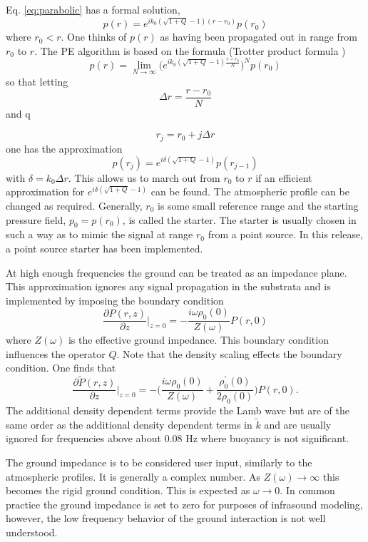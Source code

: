 Eq. \ref{eq:parabolic} has a formal solution, 
\[
p(r)=e^{ik_0(\sqrt{1+Q}-1)(r-r_0)} p(r_0)
\]
where $r_0<r$. One thinks of $p(r)$ as having been propagated out in range from $r_0$ to $r$. The PE algorithm is based on the formula (Trotter product formula \cite{stoer2013introduction})
\begin{equation}\label{eq:trotter_prod}
p(r)=\lim_{N\rightarrow\infty}\Big(e^{ik_0(\sqrt{1+Q}-1)\frac{r-r_0}{N}}\Big)^N p(r_0)
\end{equation}
so that letting 
\[
\Delta r=\frac{r-r_0}{N}
\]
and q

\[
r_j=r_0+j\Delta r
\]
one has the approximation 
\begin{equation}\label{eq:split_step}
p(r_j)=e^{i\delta(\sqrt{1+Q}-1)}p(r_{j-1})
\end{equation}
with $\delta=k_0\Delta r$. This allows us to march out from $r_0$ to $r$ if an efficient approximation for $e^{i\delta(\sqrt{1+Q}-1)}$ can be found. The atmospheric profile can be changed as required. Generally, $r_0$ is some small reference range and the starting pressure field, $p_0=p(r_0)$, is called the starter. The starter is usually chosen in such a way as to mimic the signal at range $r_0$ from a point source. In this release, a point source starter has been implemented. 

At high enough frequencies the ground can be treated as an impedance plane. This approximation ignores any signal propagation in the substrata and is implemented by imposing the boundary condition 
\begin{equation}\label{eq:impedance}
\frac{\partial P(r,z)}{\partial z}\big|_{z=0}=-\frac{i\omega\rho_0(0)}{Z(\omega)}P(r,0)
\end{equation}
where $Z(\omega)$ is the effective ground impedance. This boundary condition influences the operator $Q$. Note that the density scaling effects the boundary condition. One finds that 
\[
\frac{\partial \tilde P(r,z)}{\partial z}\big|_{z=0}
=
-\Big(\frac{i\omega\rho_0(0)}{Z(\omega)}+\frac{\rho_0^\prime(0)}{2\rho_0(0)}\Big)P(r,0).
\]
The additional density dependent terms provide the Lamb wave but are of the same order as the additional density dependent terms in $\tilde k$ and are usually ignored for frequencies above about 0.08 Hz where buoyancy is not significant. 

The ground impedance is to be considered user input, similarly to the atmospheric profiles. It is generally a complex number. As $Z(\omega)\rightarrow \infty$ this becomes the rigid ground condition. This is expected as $\omega\rightarrow 0$. In common practice the ground impedance is set to zero for purposes of infrasound modeling, however, the low frequency behavior of the ground interaction is not well understood. 

